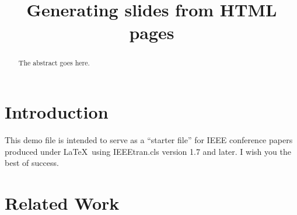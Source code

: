 \documentclass[conference, compsoc]{IEEEtran}
\begin{document}
%
\title{Generating slides from HTML pages}


\author{
\and
{}
\and
{}
}


\maketitle


\begin{abstract}
The abstract goes here.
\end{abstract}


\section{Introduction}
This demo file is intended to serve as a ``starter file''
for IEEE conference papers produced under \LaTeX\ using
IEEEtran.cls version 1.7 and later.
I wish you the best of success. \cite{test}

\section{Related Work}


{\small


}
\end{document}

